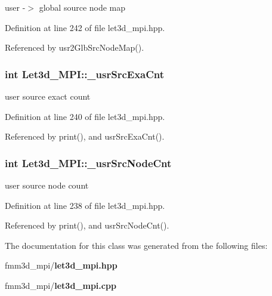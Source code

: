 user -$>$ global source node map 

Definition at line 242 of file let3d\_\-mpi.hpp.

Referenced by usr2Glb\-Src\-Node\-Map().
\subsubsection{\setlength{\rightskip}{0pt plus 5cm}int {\bf Let3d\_\-MPI::\_\-usr\-Src\-Exa\-Cnt}\hspace{0.3cm}{\tt  [protected]}}\label{classLet3d__MPI_f42842ff24d95148013ad625e1c2242f_f42842ff24d95148013ad625e1c2242f}


user source exact count 

Definition at line 240 of file let3d\_\-mpi.hpp.

Referenced by print(), and usr\-Src\-Exa\-Cnt().
\subsubsection{\setlength{\rightskip}{0pt plus 5cm}int {\bf Let3d\_\-MPI::\_\-usr\-Src\-Node\-Cnt}\hspace{0.3cm}{\tt  [protected]}}\label{classLet3d__MPI_a13aeb6e4116a1345e1cac11673b8c3e_a13aeb6e4116a1345e1cac11673b8c3e}


user source node count 

Definition at line 238 of file let3d\_\-mpi.hpp.

Referenced by print(), and usr\-Src\-Node\-Cnt().

The documentation for this class was generated from the following files:\begin{CompactItemize}
\item 
fmm3d\_\-mpi/{\bf let3d\_\-mpi.hpp}\item 
fmm3d\_\-mpi/{\bf let3d\_\-mpi.cpp}\end{CompactItemize}
